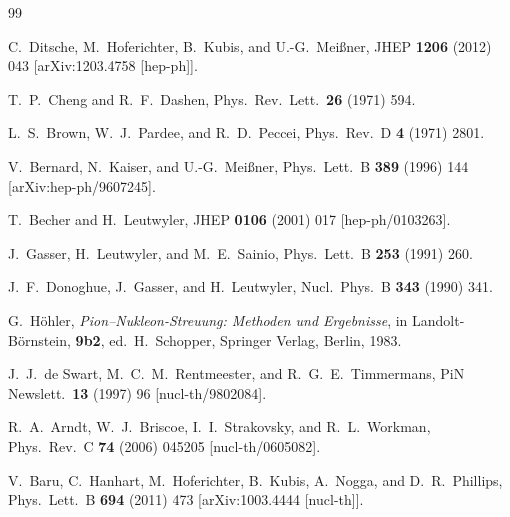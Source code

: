\documentclass[11pt]{article}%
\begin{document}
\begin{thebibliography}{99}

 C.~Ditsche, M.~Hoferichter, B.~Kubis, and U.-G.~Mei\ss ner,
  JHEP {\bf 1206} (2012) 043
 [arXiv:1203.4758 [hep-ph]].

  T.~P.~Cheng and R.~F.~Dashen,
  Phys.\ Rev.\ Lett.\  {\bf 26} (1971)  594.

  L.~S.~Brown, W.~J.~Pardee, and R.~D.~Peccei,
  Phys.\ Rev.\  D {\bf 4} (1971) 2801.

  V.~Bernard, N.~Kaiser, and U.-G.~Mei\ss ner,
  Phys.\ Lett.\  B {\bf 389} (1996) 144
  [arXiv:hep-ph/9607245].

  T.~Becher and H.~Leutwyler,
  JHEP {\bf 0106} (2001)  017
  [hep-ph/0103263].

  J.~Gasser, H.~Leutwyler, and M.~E.~Sainio,
  Phys.\ Lett.\  B {\bf 253} (1991) 260.

  J.~F.~Donoghue, J.~Gasser, and H.~Leutwyler,
  Nucl.\ Phys.\  B {\bf 343} (1990) 341.

  G.~H\"{o}hler,
  {\it Pion--Nukleon-Streuung: Methoden und Ergebnisse},
  in Landolt-B\"ornstein, {\bf 9b2}, ed.\ H.~Schopper,
  Springer Verlag, Berlin, 1983.

  J.~J.~de Swart, M.~C.~M.~Rentmeester, and R.~G.~E.~Timmermans,
  PiN Newslett.\  {\bf 13} (1997)  96
  [nucl-th/9802084].

  R.~A.~Arndt, W.~J.~Briscoe, I.~I.~Strakovsky, and R.~L.~Workman,
  Phys.\ Rev.\  C {\bf 74} (2006)  045205
  [nucl-th/0605082].

  V.~Baru, C.~Hanhart, M.~Hoferichter, B.~Kubis, A.~Nogga, and D.~R.~Phillips,
  Phys.\ Lett.\  B {\bf 694} (2011) 473
  [arXiv:1003.4444 [nucl-th]].


\end{thebibliography}
\end{document}
